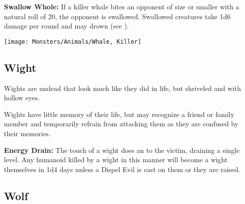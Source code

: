 \begin{multicols*}{2}
\textbf{Swallow Whole:} If a killer whale bites an opponent of  size or smaller with a natural roll of 20, the opponent is swallowed. Swallowed creatures take 1d6 damage per round and may drown (see ).

\texttt{[image: Monsters/Animals/Whale, Killer]}

\subsection{Wight}

Wights are undead that look much like they did in life, but shriveled and with hollow eyes.

Wights have little memory of their life, but may recognize a friend or family member and temporarily refrain from attacking them as they are confused by their memories.

\textbf{Energy Drain:} The touch of a wight does an  to the victim, draining a single level. Any humanoid killed by a wight in this manner will become a wight themselves in 1d4 days unless a Dispel Evil is cast on them or they are raised.

\subsection{Wolf}
\end{multicols*}
